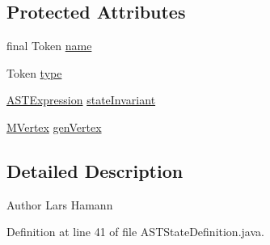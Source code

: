 \subsection*{Protected Attributes}
\begin{DoxyCompactItemize}
\item 
final Token \hyperlink{classorg_1_1tzi_1_1use_1_1parser_1_1use_1_1statemachines_1_1_a_s_t_state_definition_a5294416642d3a2490f6e55895a6aa7fb}{name}
\item 
Token \hyperlink{classorg_1_1tzi_1_1use_1_1parser_1_1use_1_1statemachines_1_1_a_s_t_state_definition_a3fe6df0731960a92abf4fc5ea85c0829}{type}
\item 
\hyperlink{classorg_1_1tzi_1_1use_1_1parser_1_1ocl_1_1_a_s_t_expression}{A\-S\-T\-Expression} \hyperlink{classorg_1_1tzi_1_1use_1_1parser_1_1use_1_1statemachines_1_1_a_s_t_state_definition_aa00d39d5255293472c31bf4843ca53d8}{state\-Invariant}
\item 
\hyperlink{classorg_1_1tzi_1_1use_1_1uml_1_1mm_1_1statemachines_1_1_m_vertex}{M\-Vertex} \hyperlink{classorg_1_1tzi_1_1use_1_1parser_1_1use_1_1statemachines_1_1_a_s_t_state_definition_ab64547b8b5d158e1e3e8e4b50d89a0e7}{gen\-Vertex}
\end{DoxyCompactItemize}


\subsection{Detailed Description}
\begin{DoxyAuthor}{Author}
Lars Hamann 
\end{DoxyAuthor}


Definition at line 41 of file A\-S\-T\-State\-Definition.\-java.



